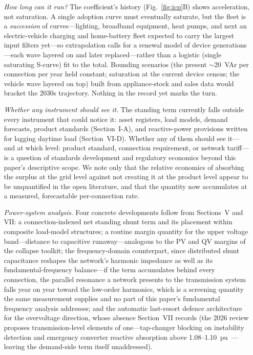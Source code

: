 \documentclass[journal]{IEEEtran}
\begin{document}
\emph{How long can it run?} The coefficient's history (Fig.~\ref{fig:icp}B)
shows acceleration, not saturation. A single adoption curve must eventually
saturate, but the fleet is a \emph{succession} of curves---lighting, broadband
equipment, heat pumps, and next an electric-vehicle charging and home-battery
fleet expected to carry the largest input filters yet---so extrapolation calls for a
renewal model of device generations---each wave layered on and later
replaced---rather than a logistic (single saturating S-curve) fit to the total.
Bounding scenarios (the present $\sim$20~VAr per connection per year held
constant; saturation at the current device census; the vehicle wave layered
on top) built from appliance-stock and sales data would bracket the 2030s
trajectory. Nothing in the record yet marks the turn.

\emph{Whether any instrument should see it.} The standing term currently
falls outside every instrument that could notice it: asset registers, load
models, demand forecasts, product standards (Section~I-A), and reactive-power
provisions written for lagging daytime load (Section~VI-D). Whether any of
them should see it---and at which level: product standard, connection
requirement, or network tariff---is a question of standards development and
regulatory economics beyond this paper's descriptive scope. We note only that
the relative economics of absorbing the surplus at the grid level against not
creating it at the product level appear to be unquantified in the open
literature, and that the quantity now accumulates at a measured, forecastable
per-connection rate.

\emph{Power-system analysis.} Four concrete developments follow from
Sections~V and VII: a connection-indexed net standing shunt term and its
placement within composite load-model structures; a routine margin quantity
for the upper voltage band---distance to capacitive runaway---analogous to the
PV and QV margins of the collapse toolkit; the frequency-domain counterpart,
since distributed shunt capacitance reshapes the network's harmonic impedance
as well as its fundamental-frequency balance---if the term accumulates behind
every connection, the parallel resonance a network presents to the transmission
system falls year on year toward the low-order harmonics, which is a screening
quantity the same measurement supplies and no part of this paper's fundamental
frequency analysis addresses; and the automatic last-resort
defence architecture for the overvoltage direction, whose absence Section~VII
records (the 2026 review proposes transmission-level elements of one---tap-changer
blocking on instability detection and emergency converter reactive absorption
above 1.08--1.10~pu~\cite{vournas2026review,vournas2026epsr}---leaving the
demand-side term itself unaddressed).
\end{document}
